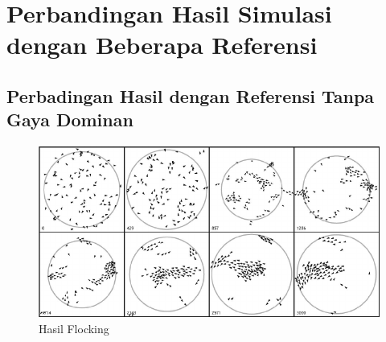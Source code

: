 \section{Perbandingan Hasil Simulasi dengan Beberapa Referensi}

\subsection{Perbadingan Hasil dengan Referensi Tanpa Gaya Dominan }%
\begin{figure}
\centering
\includegraphics[scale=0.4]{gambar/Bajec.PNG}
\caption{Hasil Flocking \citep{Bajec2007}}
\label{fig:bajec1}
\end{figure}

